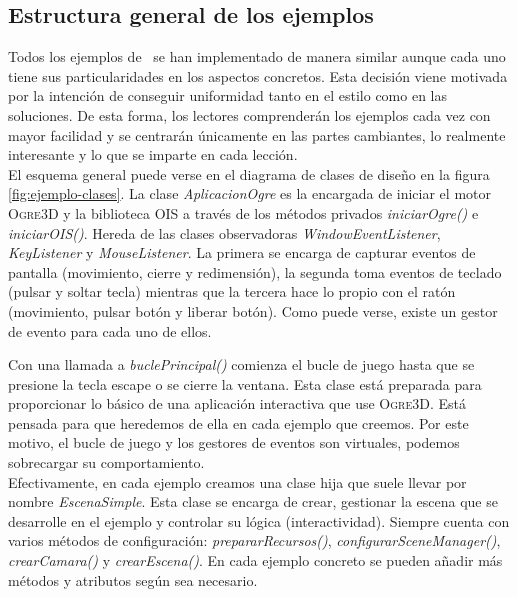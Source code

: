 \subsection{Estructura general de los ejemplos}

Todos los ejemplos de \wiki\ se han implementado de manera similar aunque
cada uno tiene sus particularidades en los aspectos concretos. Esta decisión
viene motivada por la intención de conseguir uniformidad tanto en el estilo
como en las soluciones. De esta forma, los lectores comprenderán los ejemplos
cada vez con mayor facilidad y se centrarán únicamente en las partes cambiantes,
lo realmente interesante y lo que se imparte en cada lección.\\

El esquema general puede verse en el diagrama de clases de diseño en la
figura \ref{fig:ejemplo-clases}. La clase \textit{AplicacionOgre} es la encargada
de iniciar el motor \textsc{Ogre3D} y la biblioteca \textsc{OIS} a través
de los métodos privados \textit{iniciarOgre()} e \textit{iniciarOIS()}.
Hereda de las clases observadoras \cite{gamm77} \textit{WindowEventListener},
\textit{KeyListener} y \textit{MouseListener}. La primera se encarga de
capturar eventos de pantalla (movimiento, cierre y redimensión), la segunda
toma eventos de teclado (pulsar y soltar tecla) mientras que la tercera
hace lo propio con el ratón (movimiento, pulsar botón y liberar botón).
Como puede verse, existe un gestor de evento para cada uno de ellos.\\


Con una llamada a \textit{buclePrincipal()} comienza el bucle de juego
hasta que se presione la tecla escape o se cierre la ventana. Esta clase
está preparada para proporcionar lo básico de una aplicación interactiva
que use \textsc{Ogre3D}. Está pensada para que heredemos de ella en cada
ejemplo que creemos. Por este motivo, el bucle de juego y los gestores
de eventos son virtuales, podemos sobrecargar su comportamiento.\\

Efectivamente, en cada ejemplo creamos una clase hija que suele llevar
por nombre \textit{EscenaSimple}. Esta clase se encarga de crear, gestionar
la escena que se desarrolle en el ejemplo y controlar su lógica (interactividad).
Siempre cuenta con varios métodos de configuración: \textit{prepararRecursos()},
\textit{configurarSceneManager()}, \textit{crearCamara()} y \textit{crearEscena()}.
En cada ejemplo concreto se pueden añadir más métodos y atributos según
sea necesario.\\

